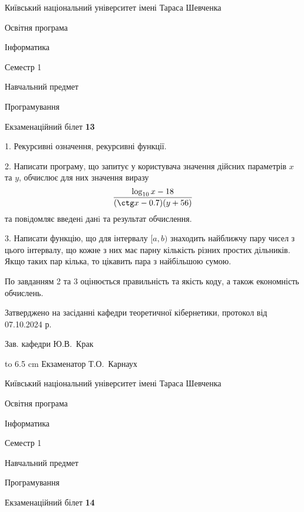 \documentclass[12pt, ukrainian]{article}
\begin{document}
\newpage
{{\begin {scriptsize}\par
{ \center  Київський національний університет імені Тараса Шевченка \par}
{\parbox {5 cm}{Освітня програма \hfill}{\parbox {7 cm}{Інформатика\hfill}}\parbox {6 cm}{\hfill Семестр 1}}\par
{\parbox {5 cm} {Навчальний предмет \hfill}\parbox {7 cm}{Програмування \hfill}\parbox {6cm}{\hfill}\par}\vspace{-15pt} \end{scriptsize}}{\center Екзаменаційний білет \No \textbf { 13 }\par}}
{%
1. Рекурсивні означення, рекурсивні функції.%
\par
2. Написати програму, що запитує у користувача значення дійсних параметрів $x$ та $y$, обчислює для них значення виразу 
$$\frac{\log_{10} x - 18}{(\ctg x - 0.7) (y + 56)}$$ 
та повiдомляє введенi данi та результат обчислення.

\par
3. Написати функцію, що для інтервалу $[a, b)$ знаходить найближчу пару чисел з цього інтервалу, що кожне з них має парну кількість різних простих дільників. Якщо таких пар кілька, то цікавить пара з найбільшою сумою.

По завданням 2 та 3 оцінюється правильність та якість коду, а також економність обчислень.

}
{\smallskip\smallskip \begin {scriptsize} Затверджено на засіданні кафедри теоретичної кібернетики, протокол   від   07.10.2024 р.\par\smallskip\smallskip\smallskip\smallskip
{\parbox {6.5 cm} {Зав. кафедри \dotfill Ю.В.~Крак}}\hspace {0.7cm} {\hbox to 6.5 cm { Екзаменатор \dotfill Т.О.~Карнаух}} \end{scriptsize}}
\vspace{0.9cm}
{{\begin {scriptsize}\par
{ \center  Київський національний університет імені Тараса Шевченка \par}
{\parbox {5 cm}{Освітня програма \hfill}{\parbox {7 cm}{Інформатика\hfill}}\parbox {6 cm}{\hfill Семестр 1}}\par
{\parbox {5 cm} {Навчальний предмет \hfill}\parbox {7 cm}{Програмування \hfill}\parbox {6cm}{\hfill}\par}\vspace{-15pt} \end{scriptsize}}{\center Екзаменаційний білет \No \textbf { 14 }\par}}
\end{document}
